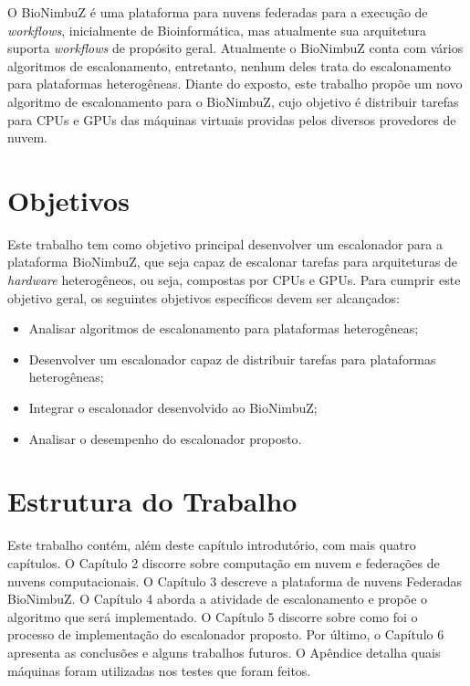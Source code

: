 O BioNimbuZ é uma plataforma para nuvens federadas para a execução de \textit{workflows}, inicialmente de Bioinformática, mas atualmente sua arquitetura suporta \textit{workflows} de propósito geral. Atualmente o BioNimbuZ conta com vários algoritmos de escalonamento, entretanto, nenhum deles trata do escalonamento para plataformas heterogêneas. Diante do exposto, este trabalho propõe um novo algoritmo de escalonamento para o BioNimbuZ, cujo objetivo é distribuir tarefas para \acrshort{CPU}s e \acrshort{GPU}s das máquinas virtuais providas pelos diversos provedores de nuvem.


\section{Objetivos}
Este trabalho tem como objetivo principal desenvolver um escalonador para a plataforma BioNimbuZ, que seja capaz de escalonar tarefas para arquiteturas de \textit{hardware} heterogêneos, ou seja, compostas por \acrshort{CPU}s e \acrshort{GPU}s. Para cumprir este objetivo geral, os seguintes objetivos específicos devem ser alcançados: 

\begin{itemize}
	\item Analisar algoritmos de escalonamento para plataformas heterogêneas;
	\item Desenvolver um escalonador capaz de distribuir tarefas para plataformas heterogêneas;
	\item Integrar o escalonador desenvolvido ao BioNimbuZ;
	\item Analisar o desempenho do escalonador proposto.
\end{itemize}

\section{Estrutura do Trabalho}
Este trabalho contém, além deste capítulo introdutório, com mais quatro capítulos. O Capítulo 2 discorre sobre computação em nuvem e federações de nuvens computacionais. O Capítulo 3 descreve a plataforma de nuvens Federadas BioNimbuZ. O Capítulo 4 aborda a atividade de escalonamento e propõe o algoritmo que será implementado. O Capítulo 5 discorre sobre como foi o processo de implementação do escalonador proposto. Por último, o Capítulo 6 apresenta as conclusões e alguns trabalhos futuros. O Apêndice detalha quais máquinas foram utilizadas nos testes que foram feitos.